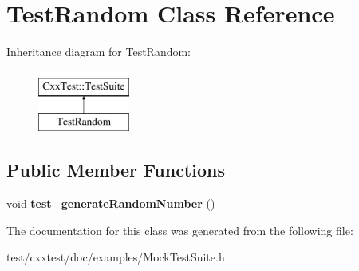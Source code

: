 \hypertarget{classTestRandom}{\section{Test\-Random Class Reference}
\label{classTestRandom}
}
Inheritance diagram for Test\-Random\-:\begin{figure}[H]
\begin{center}
\leavevmode
\includegraphics[height=2.000000cm]{classTestRandom}
\end{center}
\end{figure}
\subsection*{Public Member Functions}
\begin{DoxyCompactItemize}
\item 
\hypertarget{classTestRandom_a7c62003c02cc7ba3d93b5fab68347264}{void {\bfseries test\-\_\-generate\-Random\-Number} ()}\label{classTestRandom_a7c62003c02cc7ba3d93b5fab68347264}

\end{DoxyCompactItemize}


The documentation for this class was generated from the following file\-:\begin{DoxyCompactItemize}
\item 
test/cxxtest/doc/examples/Mock\-Test\-Suite.\-h\end{DoxyCompactItemize}
